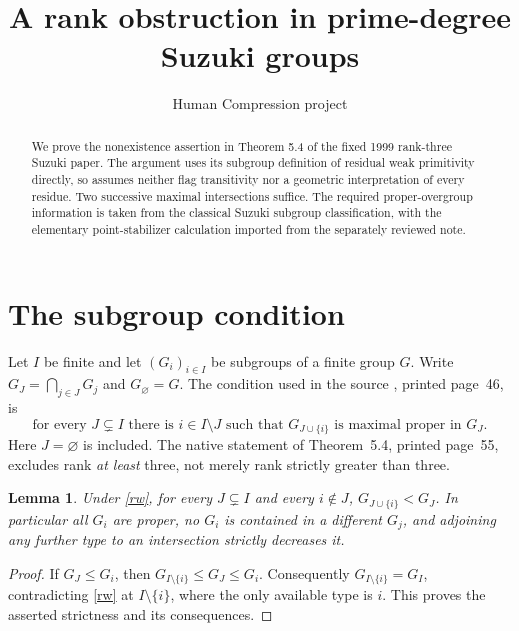 \documentclass[11pt,a4paper]{article}
\title{A rank obstruction in prime-degree Suzuki groups}
\author{Human Compression project}\date{}
\newtheorem{lemma}{Lemma}
\begin{document}
\maketitle
\begin{abstract}
We prove the nonexistence assertion in Theorem 5.4 of the fixed 1999
rank-three Suzuki paper. The argument uses its subgroup definition of
residual weak primitivity directly, so assumes neither flag transitivity
nor a geometric interpretation of every residue. Two successive maximal
intersections suffice. The required proper-overgroup information is taken
from the classical Suzuki subgroup classification, with the elementary
point-stabilizer calculation imported from the separately reviewed note.
\end{abstract}

\section{The subgroup condition}
Let $I$ be finite and let $(G_i)_{i\in I}$ be subgroups of a finite group
$G$. Write $G_J=\bigcap_{j\in J}G_j$ and $G_\varnothing=G$.
The condition used in the source \cite{source}, printed page~46, is
\begin{equation}\label{rw}
 \text{for every }J\subsetneq I\text{ there is }i\in I\setminus J
 \text{ such that }G_{J\cup\{i\}}\text{ is maximal proper in }G_J.
\end{equation}
Here $J=\varnothing$ is included. The native statement of Theorem~5.4,
printed page~55, excludes rank \emph{at least} three, not merely rank
strictly greater than three.

\begin{lemma}\label{strict}
Under \eqref{rw}, for every $J\subsetneq I$ and every $i\notin J$,
$G_{J\cup\{i\}}<G_J$. In particular all $G_i$ are proper, no $G_i$
is contained in a different $G_j$, and adjoining any further type to an
intersection strictly decreases it.
\end{lemma}
\begin{proof}
If $G_J\le G_i$, then $G_{I\setminus\{i\}}\le G_J\le G_i$.
Consequently $G_{I\setminus\{i\}}=G_I$, contradicting \eqref{rw}
at $I\setminus\{i\}$, where the only available type is $i$.
This proves the asserted strictness and its consequences.
\end{proof}
\end{document}
